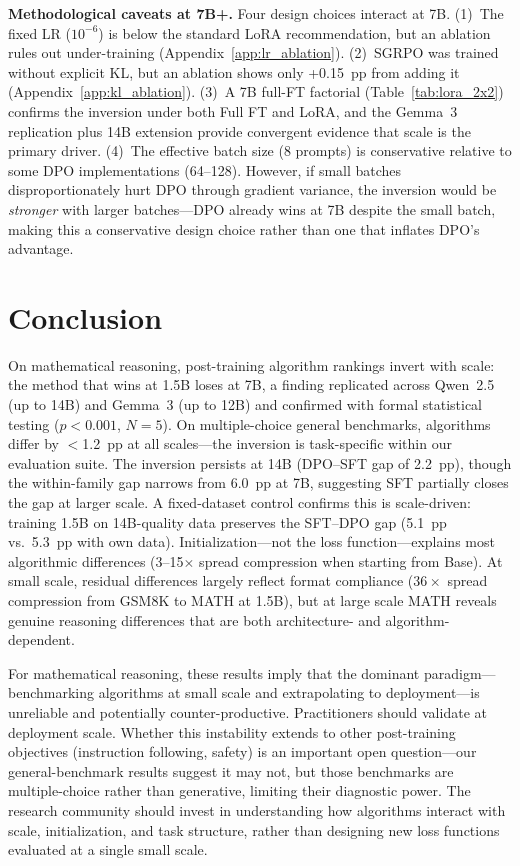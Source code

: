\documentclass{article}
\begin{document}
\textbf{Methodological caveats at 7B+.}
Four design choices interact at 7B. (1)~The fixed LR ($10^{-6}$) is below the standard LoRA recommendation, but an ablation rules out under-training (Appendix~\ref{app:lr_ablation}). (2)~SGRPO was trained without explicit KL, but an ablation shows only +0.15~pp from adding it (Appendix~\ref{app:kl_ablation}). (3)~A 7B full-FT factorial (Table~\ref{tab:lora_2x2}) confirms the inversion under both Full FT and LoRA, and the Gemma~3 replication plus 14B extension provide convergent evidence that scale is the primary driver. (4)~The effective batch size (8 prompts) is conservative relative to some DPO implementations (64--128). However, if small batches disproportionately hurt DPO through gradient variance, the inversion would be \emph{stronger} with larger batches---DPO already wins at 7B despite the small batch, making this a conservative design choice rather than one that inflates DPO's advantage.

\section{Conclusion}

On mathematical reasoning, post-training algorithm rankings invert with scale: the method that wins at 1.5B loses at 7B, a finding replicated across Qwen~2.5 (up to 14B) and Gemma~3 (up to 12B) and confirmed with formal statistical testing ($p < 0.001$, $N{=}5$). On multiple-choice general benchmarks, algorithms differ by $<$1.2~pp at all scales---the inversion is task-specific within our evaluation suite. The inversion persists at 14B (DPO--SFT gap of 2.2~pp), though the within-family gap narrows from 6.0~pp at 7B, suggesting SFT partially closes the gap at larger scale. A fixed-dataset control confirms this is scale-driven: training 1.5B on 14B-quality data preserves the SFT--DPO gap (5.1~pp vs.\ 5.3~pp with own data). Initialization---not the loss function---explains most algorithmic differences (3--15$\times$ spread compression when starting from Base). At small scale, residual differences largely reflect format compliance ($36\times$ spread compression from GSM8K to MATH at 1.5B), but at large scale MATH reveals genuine reasoning differences that are both architecture- and algorithm-dependent.

For mathematical reasoning, these results imply that the dominant paradigm---benchmarking algorithms at small scale and extrapolating to deployment---is unreliable and potentially counter-productive. Practitioners should validate at deployment scale. Whether this instability extends to other post-training objectives (instruction following, safety) is an important open question---our general-benchmark results suggest it may not, but those benchmarks are multiple-choice rather than generative, limiting their diagnostic power. The research community should invest in understanding how algorithms interact with scale, initialization, and task structure, rather than designing new loss functions evaluated at a single small scale.
\end{document}
